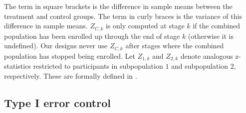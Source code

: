 \documentclass[article]{jss}
\newcommand{\htx}[2]{\hspace{ #1 cm} \text{ #2 } }
\begin{document}
The term in square brackets is the difference in sample means between the treatment and control groups. The term in curly braces is the variance of this difference in sample means. $Z_{C,k}$ is only computed at stage $k$ if the combined population has been enrolled up through the end of stage $k$ (otherwise it is undefined). Our designs never use $Z_{C,k}$ after stages where the combined population has stopped being enrolled.
Let $Z_{1,k}$ and $Z_{2,k}$ denote analogous z-statistics restricted to participants in subpopulation $1$ and subpopulation $2$, respectively. These are formally defined in
\citep{Rosenblum2013AdaptMISTIE}.

\subsection{Type I error control}
\label{sub:typeIerror}
\end{document}
